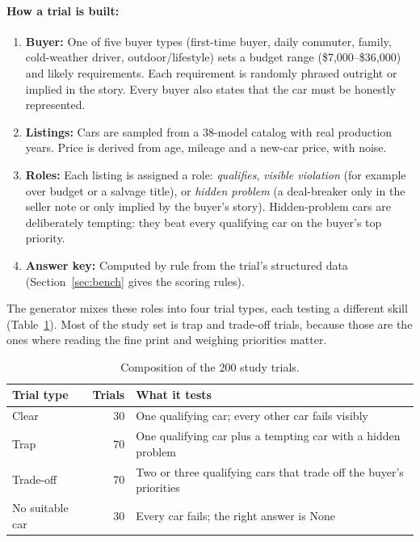 \documentclass[11pt]{article}
\begin{document}
\paragraph{How a trial is built:}
\begin{enumerate}
  \item \textbf{Buyer:} One of five buyer types (first-time buyer, daily commuter, family,
  cold-weather driver, outdoor/lifestyle) sets a budget range (\$7,000--\$36,000) and likely
  requirements. Each requirement is randomly phrased outright or implied in the story. Every buyer
  also states that the car must be honestly represented.
  \item \textbf{Listings:} Cars are sampled from a 38-model catalog with real production years.
  Price is derived from age, mileage and a new-car price, with noise.
  \item \textbf{Roles:} Each listing is assigned a role: \emph{qualifies}, \emph{visible violation}
  (for example over budget or a salvage title), or \emph{hidden problem} (a deal-breaker only in the
  seller note or only implied by the buyer's story). Hidden-problem cars are deliberately tempting:
  they beat every qualifying car on the buyer's top priority.
  \item \textbf{Answer key:} Computed by rule from the trial's structured data
  (Section~\ref{sec:bench} gives the scoring rules).
\end{enumerate}
The generator mixes these roles into four trial types, each testing a different skill
(Table~\ref{tab:composition}). Most of the study set is trap and trade-off trials, because those
are the ones where reading the fine print and weighing priorities matter.

\begin{table}[htbp]
\centering
\caption{Composition of the 200 study trials.}
\label{tab:composition}
\begin{tabularx}{\linewidth}{lrX}
\toprule
Trial type & Trials & What it tests \\
\midrule
Clear & 30 & One qualifying car; every other car fails visibly \\
Trap & 70 & One qualifying car plus a tempting car with a hidden problem \\
Trade-off & 70 & Two or three qualifying cars that trade off the buyer's priorities \\
No suitable car & 30 & Every car fails; the right answer is None \\
\bottomrule
\end{tabularx}
\end{table}
\end{document}
